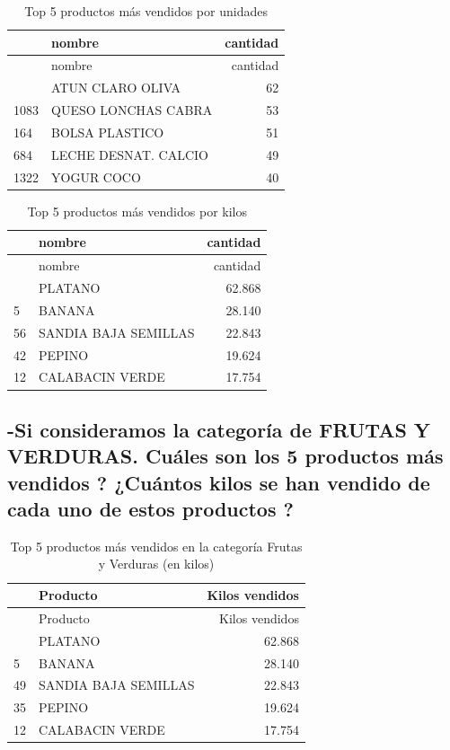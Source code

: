 \documentclass[,article,submit,moreauthors,pdftex]{Definitions/mdpi}
\begin{document}
\begin{longtable}[]{@{}llr@{}}
\caption{Top 5 productos más vendidos por unidades}\tabularnewline
\toprule\noalign{}
& nombre & cantidad \\
\midrule\noalign{}
\endfirsthead
\toprule\noalign{}
& nombre & cantidad \\
\midrule\noalign{}
\endhead
\bottomrule\noalign{}
\endlastfoot
110 & ATUN CLARO OLIVA & 62 \\
1083 & QUESO LONCHAS CABRA & 53 \\
164 & BOLSA PLASTICO & 51 \\
684 & LECHE DESNAT. CALCIO & 49 \\
1322 & YOGUR COCO & 40 \\
\end{longtable}

\begin{longtable}[]{@{}llr@{}}
\caption{Top 5 productos más vendidos por kilos}\tabularnewline
\toprule\noalign{}
& nombre & cantidad \\
\midrule\noalign{}
\endfirsthead
\toprule\noalign{}
& nombre & cantidad \\
\midrule\noalign{}
\endhead
\bottomrule\noalign{}
\endlastfoot
49 & PLATANO & 62.868 \\
5 & BANANA & 28.140 \\
56 & SANDIA BAJA SEMILLAS & 22.843 \\
42 & PEPINO & 19.624 \\
12 & CALABACIN VERDE & 17.754 \\
\end{longtable}

\hypertarget{si-consideramos-la-categoruxeda-de-frutas-y-verduras.-cuuxe1les-son-los-5-productos-muxe1s-vendidos-cuuxe1ntos-kilos-se-han-vendido-de-cada-uno-de-estos-productos}{%
\subsection{-Si consideramos la categoría de FRUTAS Y VERDURAS. Cuáles
son los 5 productos más vendidos ? ¿Cuántos kilos se han vendido de cada
uno de estos productos
?}\label{si-consideramos-la-categoruxeda-de-frutas-y-verduras.-cuuxe1les-son-los-5-productos-muxe1s-vendidos-cuuxe1ntos-kilos-se-han-vendido-de-cada-uno-de-estos-productos}}

\begin{longtable}[]{@{}llr@{}}
\caption{Top 5 productos más vendidos en la categoría Frutas y Verduras
(en kilos)}\tabularnewline
\toprule\noalign{}
& Producto & Kilos vendidos \\
\midrule\noalign{}
\endfirsthead
\toprule\noalign{}
& Producto & Kilos vendidos \\
\midrule\noalign{}
\endhead
\bottomrule\noalign{}
\endlastfoot
42 & PLATANO & 62.868 \\
5 & BANANA & 28.140 \\
49 & SANDIA BAJA SEMILLAS & 22.843 \\
35 & PEPINO & 19.624 \\
12 & CALABACIN VERDE & 17.754 \\
\end{longtable}
\end{document}
